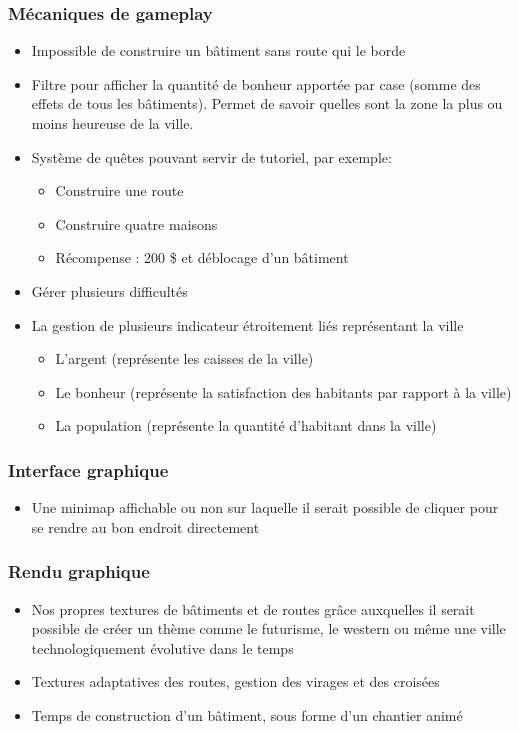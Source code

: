 \documentclass[a4paper,10pt,openany,oneside]{report}
\begin{document}
\subsubsection{Mécaniques de gameplay}
\begin{itemize}
	\item Impossible de construire un bâtiment sans route qui le borde
	\item Filtre pour afficher la quantité de bonheur apportée par case (somme des effets de tous les bâtiments). Permet de savoir quelles sont la zone la plus ou moins heureuse de la ville.
	\item Système de quêtes pouvant servir de tutoriel, par exemple:
	\begin{itemize}
		\item Construire une route
		\item Construire quatre maisons
		\item Récompense : 200 \$ et déblocage d'un bâtiment
	\end{itemize}
	\item Gérer plusieurs difficultés
	\item La gestion de plusieurs indicateur étroitement liés représentant la ville
	\begin{itemize}
		\item L'argent (représente les caisses de la ville)
		\item Le bonheur (représente la satisfaction des habitants par rapport à la ville)
		\item La population (représente la quantité d'habitant dans la ville)
	\end{itemize}
\end{itemize}

\subsubsection{Interface graphique}
\begin{itemize}

\item Une minimap affichable ou non sur laquelle il serait possible de cliquer pour se rendre au bon endroit directement
\end{itemize}

\subsubsection{Rendu graphique}
\begin{itemize}
\item Nos propres textures de bâtiments et de routes grâce auxquelles il serait possible de créer un thème comme le futurisme, le western ou même une ville technologiquement évolutive dans le temps
\item Textures adaptatives des routes, gestion des virages et des croisées
\item Temps de construction d'un bâtiment, sous forme d'un chantier animé
\end{itemize}
\end{document}
